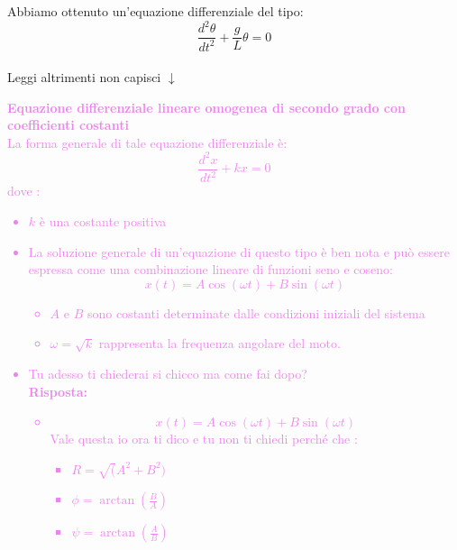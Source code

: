 \documentclass[twoside]{article}
\begin{document}
Abbiamo ottenuto un'equazione differenziale del tipo:
\begin{equation*}
  \frac{d^2\theta}{dt^2} + \frac{g}{L} \theta = 0
\end{equation*}\\
Leggi altrimenti non capisci \(\downarrow\)\\
{\small \textcolor{violet}{
  \textbf{Equazione differenziale lineare omogenea di secondo grado con coefficienti costanti}\\
  La forma generale di tale equazione differenziale è:
  \begin{equation*}
    \frac{d^2x}{dt^2} + kx = 0
  \end{equation*}
  dove :
  \begin{itemize}
    \item \(k\) è una costante positiva
    \item La soluzione generale di un'equazione di questo tipo è ben nota e può essere espressa come una combinazione lineare di funzioni seno e coseno:
          \begin{equation*}
            x(t) = A\cos(\omega t) + B\sin(\omega t)
          \end{equation*}
          \begin{itemize}
            \item \(A\) e \(B\) sono costanti determinate dalle condizioni iniziali del sistema
            \item \(\omega = \sqrt{k}\) rappresenta la frequenza angolare del moto.
          \end{itemize}
    \item Tu adesso ti chiederai si chicco ma come fai dopo?\\
          \textbf{Risposta:} \\
          \begin{itemize}
            \item
                  \begin{equation*}
                    x(t) = A\cos(\omega t) + B\sin(\omega t)
                  \end{equation*}
                  Vale questa io ora ti dico e tu non ti chiedi perché che : \\
                  \begin{itemize}
                    \item \(R = \sqrt( A^2 + B^2 )\)
                    \item \(\phi = \arctan(\frac{B}{A})\)
                    \item \(\psi = \arctan(\frac{A}{B})\)

\end{itemize}
\end{itemize}
\end{itemize}}}
\end{document}
